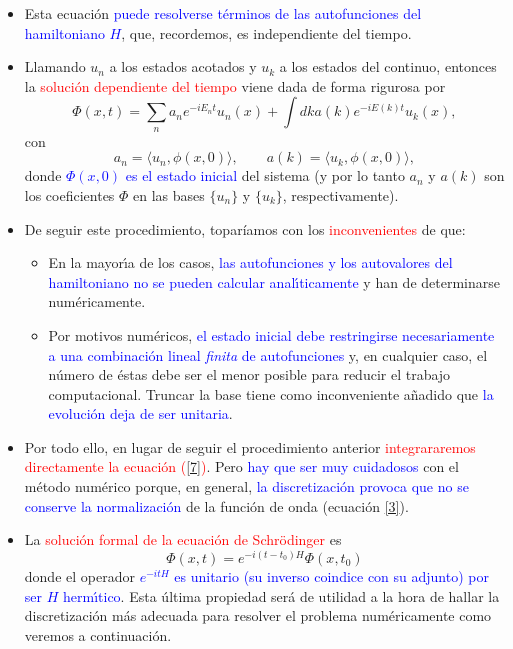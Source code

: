 \documentclass[12pt,spanish]{iopart}
\def\az{\textcolor{blue}}
\def\ro{\textcolor{red}}
\begin{document}
\begin{itemize}
\item Esta ecuaci\'on \az{puede resolverse t\'erminos de las autofunciones del hamiltoniano $H$}, 
que, recordemos, es independiente del tiempo. 

\item Llamando $u_n$ a los estados acotados y 
$u_k$ a los estados del continuo, entonces la \ro{soluci\'on dependiente del tiempo} viene
dada de forma rigurosa por 
%
\begin{equation}
\Phi(x,t)=\sum_n a_n e^{-iE_n t} u_n(x) + \int dk a(k) e^{-iE(k)t} u_k(x),
\end{equation} 
con
\begin{equation}
a_n=\langle u_n,\phi(x,0)\rangle, \qquad a(k)=\langle u_k,\phi(x,0)\rangle,
\end{equation}
%
donde \az{$\Phi(x,0)$ es el estado inicial} del sistema (y por lo tanto $a_n$ y
$a(k)$ son los coeficientes $\Phi$ en las bases $\{u_n\}$ y $\{u_k\}$, respectivamente). 

\item De seguir este procedimiento, topar\'iamos con los \ro{inconvenientes} de que:
\begin{itemize}
\item En la mayor\'{\i}a de los casos, \az{las autofunciones y los autovalores del hamiltoniano no se pueden calcular
anal\'{\i}ticamente} y han de determinarse num\'ericamente.

\item Por motivos num\'ericos, \az{el estado inicial debe restringirse necesariamente a una combinaci\'on lineal
{\em finita} de autofunciones} y, en cualquier caso, el n\'umero de \'estas debe ser el menor 
posible para reducir el trabajo computacional. Truncar la base tiene como inconveniente a\~nadido
que \az{la evoluci\'on deja de ser unitaria}.
\end{itemize}

\item Por todo ello, en lugar de seguir el procedimiento anterior \ro{integrararemos directamente la ecuaci\'on (\ref{7})}.
Pero \az{hay que ser muy cuidadosos} con el m\'etodo num\'erico porque, en general, \az{la discretizaci\'on provoca que no
se conserve la normalizaci\'on} de la funci\'on de onda (ecuaci\'on \ref{3}).

\item La \ro{soluci{\'o}n formal de la ecuaci{\'o}n de Schr\"odinger} es
%
\begin{equation}
\label{evol0}
\Phi(x,t)=e^{-i(t-t_0)H} \Phi(x,t_0)
\end{equation}
%
donde el operador \az{$e^{-itH}$ es unitario (su inverso coindice con su adjunto) por ser $H$ herm{\'\i}tico}. Esta {\'u}ltima
propiedad ser{\'a} de utilidad  a la hora de hallar la discretizaci{\'o}n m{\'a}s adecuada para resolver el problema
num\'ericamente como veremos a continuaci\'on.

\end{itemize}
\end{document}
